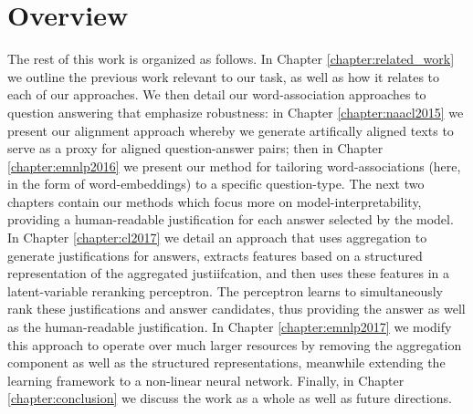 
\section{Overview\label{sec:overview}}

The rest of this work is organized as follows.  In Chapter \ref{chapter:related_work} we outline the previous work relevant to our task, as well as how it relates to each of our approaches.  
We then detail our word-association approaches to question answering that emphasize robustness: in Chapter \ref{chapter:naacl2015} we present our alignment approach whereby we generate artifically aligned texts to serve as a proxy for aligned question-answer pairs; then in Chapter \ref{chapter:emnlp2016} we present our method for tailoring word-associations (here, in the form of word-embeddings) to a specific question-type.  The next two chapters contain our methods which focus more on model-interpretability, providing a human-readable justification for each answer selected by the model.  In Chapter \ref{chapter:cl2017} we detail an approach that uses aggregation to generate justifications for answers, extracts features based on a structured representation of the aggregated justiifcation, and then uses these features in a latent-variable reranking perceptron.  The perceptron learns to simultaneously rank these justifications and answer candidates, thus providing the answer as well as the human-readable justification.  In Chapter \ref{chapter:emnlp2017} we modify this approach to operate over much larger resources by removing the aggregation component as well as the structured representations, meanwhile extending the learning framework to a non-linear neural network.  Finally, in Chapter \ref{chapter:conclusion} we discuss the work as a whole as well as future directions.

